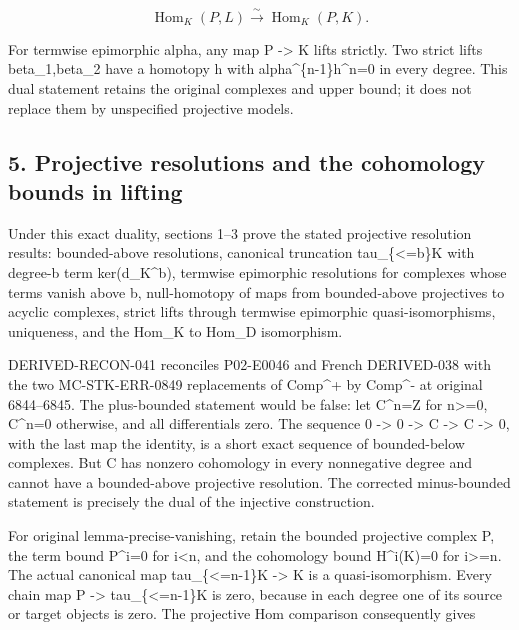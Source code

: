 \[
 \operatorname{Hom}_K(P,L)\xrightarrow{\sim}\operatorname{Hom}_K(P,K).
                                                               \tag{4.5}
\]

For termwise epimorphic alpha,\allowbreak{} any map P \allowbreak{}-> K lifts strictly. Two strict lifts beta\_\allowbreak{}1,\allowbreak{}beta\_\allowbreak{}2 have a homotopy h with alpha\textasciicircum{}\{n-1\}h\textasciicircum{}n\allowbreak{}=0 in every degree. This dual statement retains the original complexes and upper bound; it does not replace them by unspecified projective models.

\subsection{5. Projective resolutions and the cohomology bounds in lifting}\label{proofs-6209-7089-projective-resolutions-and-the-cohomology-bounds-in-lifting}

Under this exact duality,\allowbreak{} sections 1–\allowbreak{}3 prove the stated projective resolution results:\allowbreak{} bounded-above resolutions,\allowbreak{} canonical truncation tau\_\allowbreak{}\{<\allowbreak{}=b\}K with degree-b term ker(d\_\allowbreak{}K\textasciicircum{}b)\allowbreak{},\allowbreak{} termwise epimorphic resolutions for complexes whose terms vanish above b,\allowbreak{} null-homotopy of maps from bounded-above projectives to acyclic complexes,\allowbreak{} strict lifts through termwise epimorphic quasi-isomorphisms,\allowbreak{} uniqueness,\allowbreak{} and the Hom\_\allowbreak{}K to Hom\_\allowbreak{}D isomorphism.

DERIVED-RECON-041 reconciles P02-E0046 and French DERIVED-038 with the two MC-STK-ERR-0849 replacements of Comp\textasciicircum{}\allowbreak{}+ by Comp\^{}- at original 6844–\allowbreak{}6845. The plus-bounded statement would be false:\allowbreak{} let C\textasciicircum{}n\allowbreak{}=Z for n>\allowbreak{}=0,\allowbreak{} C\textasciicircum{}n\allowbreak{}=0 otherwise,\allowbreak{} and all differentials zero. The sequence 0 \allowbreak{}-> 0 \allowbreak{}-> C \allowbreak{}-> C \allowbreak{}-> 0,\allowbreak{} with the last map the identity,\allowbreak{} is a short exact sequence of bounded-below complexes. But C has nonzero cohomology in every nonnegative degree and cannot have a bounded-above projective resolution. The corrected minus-bounded statement is precisely the dual of the injective construction.

For original lemma-precise-vanishing,\allowbreak{} retain the bounded projective complex P,\allowbreak{} the term bound P\textasciicircum{}i\allowbreak{}=0 for i<n,\allowbreak{} and the cohomology bound H\textasciicircum{}i(K)\allowbreak{}\allowbreak{}=0 for i>\allowbreak{}=n. The actual canonical map tau\_\allowbreak{}\{<\allowbreak{}=n-1\}K \allowbreak{}-> K is a quasi-isomorphism. Every chain map P \allowbreak{}-> tau\_\allowbreak{}\{<\allowbreak{}=n-1\}K is zero,\allowbreak{} because in each degree one of its source or target objects is zero. The projective Hom comparison consequently gives

